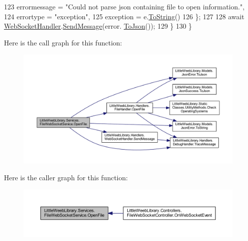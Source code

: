 \begin{DoxyCode}
123                     errormessage = \textcolor{stringliteral}{"Could not parse json containing file to open information."},
124                     errortype = \textcolor{stringliteral}{"exception"},
125                     exception = e.\mbox{\hyperlink{class_little_weeb_library_1_1_models_1_1_json_error_ad7d5522c90119111d2e929f39e7f6d3c}{ToString}}()
126                 \};
127 
128                 await \mbox{\hyperlink{class_little_weeb_library_1_1_handlers_1_1_web_socket_handler}{WebSocketHandler}}.\mbox{\hyperlink{class_little_weeb_library_1_1_handlers_1_1_web_socket_handler_a1de289d54d665a32c93478c68d3e6ad0}{SendMessage}}(error.
      \mbox{\hyperlink{class_little_weeb_library_1_1_models_1_1_json_error_a0e3e7dd2e2990404b7f0461742b23440}{ToJson}}());
129             \}        
130         \}
\end{DoxyCode}
Here is the call graph for this function\+:\nopagebreak
\begin{figure}[H]
\begin{center}
\leavevmode
\includegraphics[width=350pt]{class_little_weeb_library_1_1_services_1_1_file_web_socket_service_ae140d076e6f64585e7b71bb51545e1bb_cgraph}
\end{center}
\end{figure}
Here is the caller graph for this function\+:\nopagebreak
\begin{figure}[H]
\begin{center}
\leavevmode
\includegraphics[width=350pt]{class_little_weeb_library_1_1_services_1_1_file_web_socket_service_ae140d076e6f64585e7b71bb51545e1bb_icgraph}
\end{center}
\end{figure}



